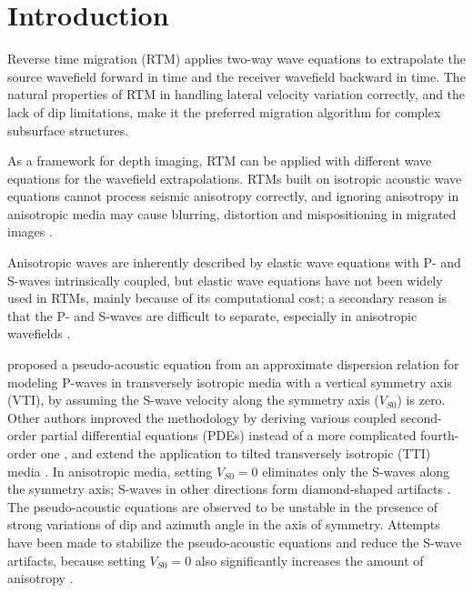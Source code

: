 \documentclass[manuscript,ulem,graphix,revised]{geophysics}
\begin{document}
\section{Introduction}
\indent\indent
Reverse time migration (RTM) \citep{mcmechan83, whitmore83,baysal83} applies two-way wave equations to extrapolate the source wavefield forward in time and the receiver wavefield backward in time. The natural properties of RTM in handling lateral velocity variation correctly, and the lack of dip limitations, make it the preferred migration algorithm for complex subsurface structures.

As a framework for depth imaging, RTM can be applied with different wave equations for the wavefield extrapolations. RTMs built on isotropic acoustic wave equations cannot process seismic anisotropy correctly, and ignoring anisotropy in anisotropic media may cause blurring, distortion and mispositioning in migrated images \citep{huang09}. 

Anisotropic waves are inherently described by elastic wave equations with P- and S-waves intrinsically coupled, but elastic wave equations have not been widely used in RTMs, mainly because of its computational cost; a secondary reason is that the P- and S-waves are difficult to separate, especially in anisotropic wavefields \citep{dellinger90}. 

\citet{alkhalifah98} proposed a pseudo-acoustic equation from an approximate dispersion relation for modeling P-waves in transversely isotropic media with a vertical symmetry axis (VTI), by assuming the S-wave velocity along the symmetry axis ($V_{S0}$) is zero. Other authors improved the methodology by deriving various coupled second-order partial differential equations (PDEs) instead of a more complicated fourth-order one \citep{alkhalifah00,klie01,hestholm07,du08,fowler10}, and extend the application to tilted transversely isotropic (TTI) media \citep{zhou06}. In anisotropic media, setting $V_{S0}=0$ eliminates only the S-waves along the symmetry axis; S-waves in other directions form diamond-shaped artifacts \citep{grechka04}. 
The pseudo-acoustic equations are observed to be unstable \citep{fletcher08, zhang08} in the presence of strong variations of dip and azimuth angle in the axis of symmetry. Attempts have been made to stabilize the pseudo-acoustic equations and reduce the S-wave artifacts, because setting $V_{S0}=0$ also significantly increases the amount of anisotropy \citep{alkhalifah00, fletcher09,zhang11}. 
\end{document}
